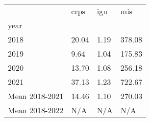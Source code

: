 \begin{tabular}{llll}
\toprule
 & crps & ign & mis \\
year &  &  &  \\
\midrule
2018 & 20.04 & 1.19 & 378.08 \\
2019 & 9.64 & 1.04 & 175.83 \\
2020 & 13.70 & 1.08 & 256.18 \\
2021 & 37.13 & 1.23 & 722.67 \\
Mean 2018-2021 & 14.46 & 1.10 & 270.03 \\
Mean 2018-2022 & N/A & N/A & N/A \\
\bottomrule
\end{tabular}

